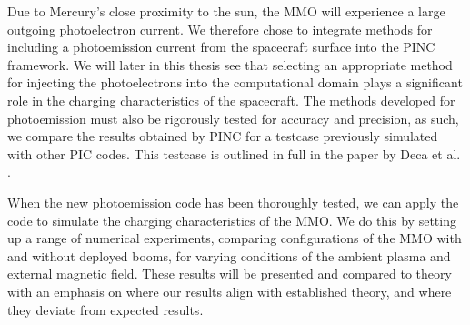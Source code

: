 Due to Mercury's close proximity to the sun, the MMO will experience a large outgoing photoelectron current. We therefore chose to integrate methods for including a photoemission current from the spacecraft surface into the PINC framework. We will later in this thesis see that selecting an appropriate method for injecting the photoelectrons into the computational domain plays a significant role in the charging characteristics of the spacecraft. The methods developed for photoemission must also be rigorously tested for accuracy and precision, as such, we compare the results obtained by PINC for a testcase previously simulated with other PIC codes. This testcase is outlined in full in the paper by Deca et al. \parencite{Deca2013}.

When the new photoemission code has been thoroughly tested, we can apply the code to simulate the charging characteristics of the MMO. We do this by setting up a range of numerical experiments, comparing configurations of the MMO with and without deployed booms, for varying conditions of the ambient plasma and external magnetic field. These results will be presented and compared to theory with an emphasis on where our results align with established theory, and where they deviate from expected results. 
\newpage
